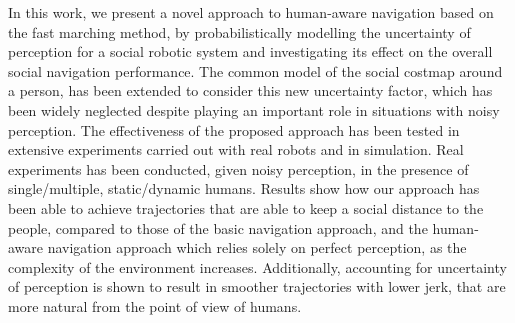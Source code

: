 In this work, we present a novel approach to human-aware navigation based on the fast marching method, by probabilistically modelling the uncertainty of perception for a social robotic system and investigating its effect on the overall social navigation performance. The common model of the social costmap around a person, has been extended to consider this new uncertainty factor, which has been widely neglected despite playing an important role in situations with noisy perception.  
The effectiveness of the proposed approach has been tested in extensive experiments carried out with real robots and in simulation. Real experiments has been conducted, given noisy perception, in the presence of single/multiple, static/dynamic humans. Results show how our approach has been able to achieve trajectories that are able to keep a social distance to the people, compared to those of the basic navigation approach, and the human-aware navigation approach which relies solely on perfect perception, as the complexity of the environment increases. Additionally, accounting for uncertainty of perception is shown to result in smoother trajectories with lower jerk, that are more natural from the point of view of humans. 


